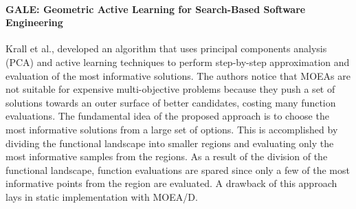         \paragraph{GALE: Geometric Active Learning for Search-Based Software Engineering} Krall et al.,\cite{KrallMD15} developed an algorithm that uses principal components analysis (PCA) and active learning techniques to perform step-by-step approximation and evaluation of the most informative solutions. The authors notice that MOEAs are not suitable for expensive multi-objective problems because they push a set of solutions towards an outer surface of better candidates, costing many function evaluations. The fundamental idea of the proposed approach is to choose the most informative solutions from a large set of options. This is accomplished by dividing the functional landscape into smaller regions and evaluating only the most informative samples from the regions. As a result of the division of the functional landscape, function evaluations are spared since only a few of the most informative points from the region are evaluated. A drawback of this approach lays in static implementation with MOEA/D.        


